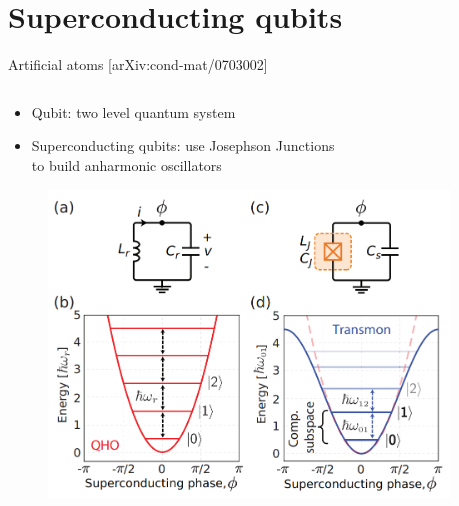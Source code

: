 \documentclass[aspectratio=169,10pt]{beamer}
\begin{document}
\section{Superconducting qubits}

\begin{frame}{Artificial atoms \hfill{\small[arXiv:cond-mat/0703002]}}
  \begin{columns}
    \begin{column}{0.6\textwidth}
      \centering
      \begin{itemize}
        \item<1-> Qubit: two level quantum system
        \hspace{10 mm}
        \item<2-> Superconducting qubits: use Josephson Junctions\\ to build anharmonic oscillators
      \end{itemize}
      \begin{figure}
        \centering
        \includegraphics[height=0.5\textheight]{figures/Transmon.png}\\
      \end{figure}
    \end{column}
    \begin{column}{0.6\textwidth}
      \centering

\end{column}
\end{columns}
\end{frame}
\end{document}
